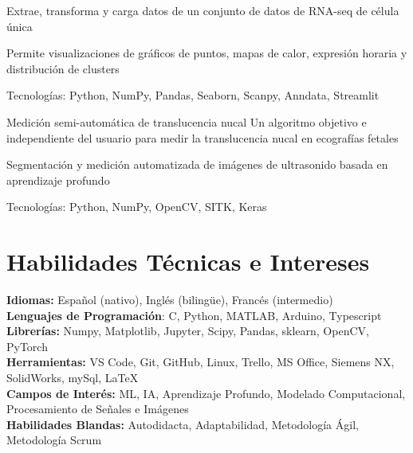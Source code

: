 \documentclass{resume}
\begin{document}
    \resumeItemListStart
    \item {Extrae, transforma y carga datos de un conjunto de datos de RNA-seq de célula única}
    \item {Permite visualizaciones de gráficos de puntos, mapas de calor, expresión horaria y distribución de clusters}
    \item {Tecnologías: Python, NumPy, Pandas, Seaborn, Scanpy, Anndata, Streamlit}
    \resumeItemListEnd

    \resumeProject
    {Medición semi-automática de translucencia nucal} %
    {Un algoritmo objetivo e independiente del usuario para medir la translucencia nucal en ecografías fetales}
    {} %

    \resumeItemListStart
    \item
    {Segmentación y medición automatizada de imágenes de ultrasonido basada en aprendizaje profundo}
    \item {Tecnologías: Python, NumPy, OpenCV, SITK, Keras}
    \resumeItemListEnd

    \resumeSubHeadingListEnd


    \vspace{-5mm}


    \section{\textbf{Habilidades Técnicas e Intereses}} \label{sec:skills}
    \begin{itemize}[leftmargin=0.05in, label={}]
        \small{\item{
            \textbf{Idiomas:}{ Español (nativo), Inglés (bilingüe}), Francés (intermedio) } \\
        \textbf{Lenguajes de Programación}{: C, Python, MATLAB, Arduino, Typescript } \\
        \textbf{Librerías:}{ Numpy, Matplotlib, Jupyter, Scipy, Pandas, sklearn, OpenCV, PyTorch}\\
        \textbf{Herramientas:}{ VS Code, Git, GitHub, Linux, Trello, MS Office, Siemens NX, SolidWorks, mySql,
            \LaTeX} \\
        \textbf{Campos de Interés:}
        {ML, IA, Aprendizaje Profundo, Modelado Computacional, Procesamiento de Señales e Imágenes} \\
        \textbf{Habilidades Blandas:}{ Autodidacta, Adaptabilidad, Metodología Ágil, Metodología Scrum} \\
        }
    \end{itemize}
\end{document}
